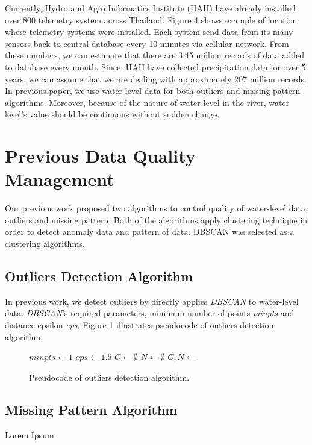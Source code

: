 \documentclass[conference]{IEEEtran}
\begin{document}
Currently, Hydro and Agro Informatics Institute (HAII) have already installed over 800 telemetry system across Thailand. Figure 4 shows example of location where telemetry systems were installed. Each system send data from its many sensors back to central database every 10 minutes via cellular network. From these numbers, we can estimate that there are 3.45 million records of data added to database every month. Since, HAII have collected precipitation data for over 5 years, we can assume that we are dealing with approximately 207 million records. In previous paper, we use water level data for both outliers and missing pattern algorithms. Moreover, because of the nature of water level in the river, water level's value should be continuous without sudden change.

\section{Previous Data Quality Management}

Our previous work proposed two algorithms to control quality of water-level data, outliers and missing pattern. Both of the algorithms apply clustering technique in order to detect anomaly data and pattern of data. DBSCAN was selected as a clustering algorithms.

\subsection{Outliers Detection Algorithm}
In previous work, we detect outliers by directly applies \textit{DBSCAN} to water-level data. \textit{DBSCAN}'s required parameters, minimum number of points \textit{minpts} and distance epsilon \textit{eps}. Figure \ref{fig:outliers_pseudocode} illustrates pseudocode of outliers detection algorithm.

\begin{figure}[H]
\begin{algorithmic}[1]

\State $minpts\gets1$
\State $eps\gets1.5 $
\State $C\gets\emptyset$
\State $N\gets\emptyset$
\State $C, N \gets $
\State {}
\EndProcedure
\end{algorithmic}
\caption{Pseudocode of outliers detection algorithm.}
\label{fig:outliers_pseudocode}
\end{figure}

\subsection{Missing Pattern Algorithm}
Lorem Ipsum
\end{document}
